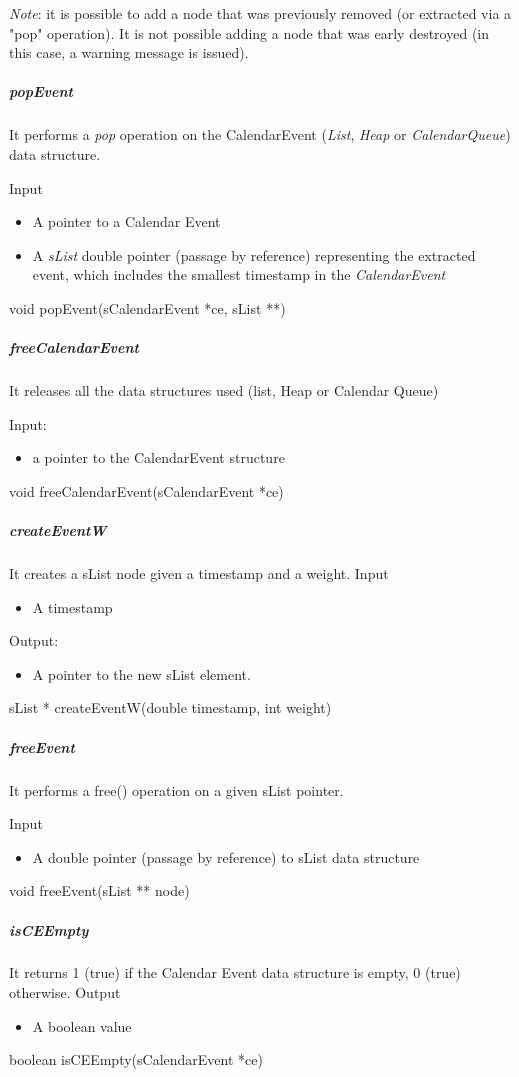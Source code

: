 \textit{Note}: it is possible to add a node that was previously removed (or extracted via a "pop" operation).
It is not possible adding a node that was early destroyed (in this case, a warning message is issued).

\subparagraph{popEvent}

It performs a \textit{pop} operation on the CalendarEvent (\textit{List}, \textit{Heap} or \textit{CalendarQueue}) data structure.

Input
\begin{itemize}
\item A pointer to a Calendar Event
\item A \textit{sList} double pointer (passage by reference) representing the extracted event, which includes the smallest timestamp in the \textit{CalendarEvent} 
\end{itemize}
void popEvent(sCalendarEvent *ce, sList **)


\subparagraph{freeCalendarEvent}

It releases all the data structures used (list, Heap or Calendar Queue)

Input: 
\begin{itemize}	
\item a pointer to the CalendarEvent structure
\end{itemize}
void freeCalendarEvent(sCalendarEvent *ce)

\subparagraph{createEventW}

It creates a sList node given a timestamp and a weight.
Input
\begin{itemize}
\item A timestamp
\end{itemize}
Output:
\begin{itemize}
\item A pointer to the new sList element.
\end{itemize}
sList * createEventW(double timestamp, int weight)

\subparagraph{freeEvent}

It performs a free() operation on a given sList pointer.

Input
\begin{itemize}
\item A double pointer (passage by reference) to sList data structure
\end{itemize}
void freeEvent(sList ** node)


\subparagraph{isCEEmpty}

It returns 1 (true) if the Calendar Event data structure is empty, 0 (true) otherwise.
Output
\begin{itemize}
\item A boolean value
\end{itemize}
boolean isCEEmpty(sCalendarEvent *ce)

